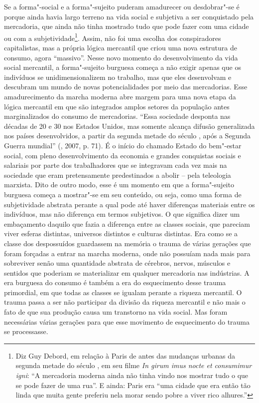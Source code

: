 {Se a forma"-social e a forma"-sujeito puderam amadurecer ou desdobrar"-se é
porque ainda havia largo terreno na vida social e subjetiva a ser
conquistado pela mercadoria, que ainda não tinha mostrado tudo que pode
fazer com uma cidade ou com a subjetividade\footnote{Diz Guy Debord, em
  relação à Paris de antes das mudanças urbanas da segunda metade do
  século , em seu filme \emph{In girum imus nocte et consumimur igni}:
  ``A mercadoria moderna ainda não tinha vindo nos mostrar tudo o que se
  pode fazer de uma rua''. E ainda: Paris era ``uma cidade que era então
  tão linda que muita gente preferiu nela morar sendo pobre a viver rico
  alhures.''}. Assim, não foi uma escolha dos conspiradores
capitalistas, mas a própria lógica mercantil que criou uma nova
estrutura de consumo, agora ``massivo''. Nesse novo momento do
desenvolvimento da vida social mercantil, a forma"-sujeito burguesa
começa a não exigir apenas que os indivíduos se unidimensionalizem no
trabalho, mas que eles desenvolvam e descubram um mundo de novas
potencialidades por meio das mercadorias. Esse amadurecimento da marcha
moderna abre margem para uma nova etapa da lógica mercantil em que são
integrados amplos setores da população antes marginalizados do consumo
de mercadorias. ``Essa sociedade desponta nas décadas de 20 e 30 nos
Estados Unidos, mas somente alcança difusão generalizada nos países
desenvolvidos, a partir da segunda metade do século , após a Segunda
Guerra mundial'' (, 2007, p. 71). É o início do chamado Estado
do bem"-estar social, com pleno desenvolvimento da economia e grandes
conquistas sociais e salariais por parte dos trabalhadores que se
integravam cada vez mais na sociedade que eram pretensamente
predestinados a abolir -- pela teleologia marxista. Dito de outro modo,
esse é um momento em que a forma"-sujeito burguesa começa a mostrar"-se em
seu conteúdo, ou seja, como uma forma de subjetividade abstrata perante
a qual pode até haver diferenças materiais entre os indivíduos, mas não
diferença em termos subjetivos. O que significa dizer um embaçamento
daquilo que fazia a diferença entre as classes sociais, que pareciam
viver esferas distintas, universos distintos e culturas distintas. Era
como se a classe dos despossuídos guardassem na memória o trauma de
várias gerações que foram forçadas a entrar na marcha moderna, onde não
possuíam nada mais para sobreviver senão uma quantidade abstrata de
cérebros, nervos, músculos e sentidos que poderiam se materializar em
qualquer mercadoria nas indústrias. A era burguesa do consumo é também a
era do esquecimento desse trauma primordial, em que todas as classes se
igualam perante a riqueza mercantil. O trauma passa a ser não participar
da divisão da riqueza mercantil e não mais o fato de que sua produção
causa um transtorno na vida social. Mas foram necessárias várias
gerações para que esse movimento de esquecimento do trauma se
processasse.

}
